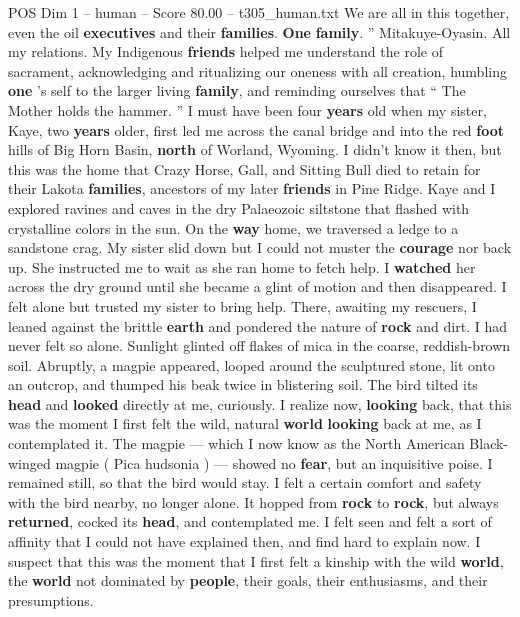 \begin{textsample}{POS Dim 1 – human – Score 80.00 – t305\_human.txt}
We are all in this together, even the oil \textbf{executives} and their \textbf{families}. \textbf{One} \textbf{family}. ” Mitakuye-Oyasin.
All my relations.
My Indigenous \textbf{friends} helped me understand the role of sacrament, acknowledging and ritualizing our oneness with all creation, humbling \textbf{one} ’s self to the larger living \textbf{family}, and reminding ourselves that “ The Mother holds the hammer. ” I must have been four \textbf{years} old when my sister, Kaye, two \textbf{years} older, first led me across the canal bridge and into the red \textbf{foot} hills of Big Horn Basin, \textbf{north} of Worland, Wyoming.
I didn't know it then, but this was the home that Crazy Horse, Gall, and Sitting Bull died to retain for their Lakota \textbf{families}, ancestors of my later \textbf{friends} in Pine Ridge.
Kaye and I explored ravines and caves in the dry Palaeozoic siltstone that flashed with crystalline colors in the sun.
On the \textbf{way} home, we traversed a ledge to a sandstone crag.
My sister slid down but I could not muster the \textbf{courage} nor back up.
She instructed me to wait as she ran home to fetch help.
I \textbf{watched} her across the dry ground until she became a glint of motion and then disappeared.
I felt alone but trusted my sister to bring help.
There, awaiting my rescuers, I leaned against the brittle \textbf{earth} and pondered the nature of \textbf{rock} and dirt.
I had never felt so alone.
Sunlight glinted off flakes of mica in the coarse, reddish-brown soil.
Abruptly, a magpie appeared, looped around the sculptured stone, lit onto an outcrop, and thumped his beak twice in blistering soil.
The bird tilted its \textbf{head} and \textbf{looked} directly at me, curiously.
I realize now, \textbf{looking} back, that this was the moment I first felt the wild, natural \textbf{world} \textbf{looking} back at me, as I contemplated it.
The magpie — which I now know as the North American Black-winged magpie ( Pica hudsonia ) — showed no \textbf{fear}, but an inquisitive poise.
I remained still, so that the bird would stay.
I felt a certain comfort and safety with the bird nearby, no longer alone.
It hopped from \textbf{rock} to \textbf{rock}, but always \textbf{returned}, cocked its \textbf{head}, and contemplated me.
I felt seen and felt a sort of affinity that I could not have explained then, and find hard to explain now.
I suspect that this was the moment that I first felt a kinship with the wild \textbf{world}, the \textbf{world} not dominated by \textbf{people}, their goals, their enthusiasms, and their presumptions.

\end{textsample}
